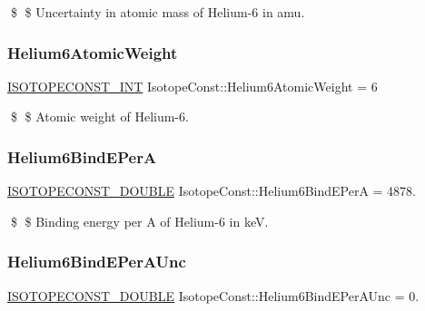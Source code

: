 \$ \$ Uncertainty in atomic mass of Helium-\/6 in amu. \mbox{\label{group___isotope_const-_helium-_he6_ga91ca6cd6a13ee8bc9603870270044db0}} 
\subsubsection{\texorpdfstring{Helium6\+Atomic\+Weight}{Helium6AtomicWeight}}
{\footnotesize\ttfamily \mbox{\hyperlink{group___isotope_const-_macros_ga5f18360b3e99483a35c32d789e62621c}{I\+S\+O\+T\+O\+P\+E\+C\+O\+N\+S\+T\+\_\+\+I\+NT}} Isotope\+Const\+::\+Helium6\+Atomic\+Weight = 6}

\$ \$ Atomic weight of Helium-\/6. \mbox{\label{group___isotope_const-_helium-_he6_gabf28d69da886bab011ba74c62dc3062b}} 
\subsubsection{\texorpdfstring{Helium6\+Bind\+E\+PerA}{Helium6BindEPerA}}
{\footnotesize\ttfamily \mbox{\hyperlink{group___isotope_const-_macros_ga8f45a7272ce02c0b4c65c44636ed719a}{I\+S\+O\+T\+O\+P\+E\+C\+O\+N\+S\+T\+\_\+\+D\+O\+U\+B\+LE}} Isotope\+Const\+::\+Helium6\+Bind\+E\+PerA = 4878.}

\$ \$ Binding energy per A of Helium-\/6 in keV. \mbox{\label{group___isotope_const-_helium-_he6_gabb8237587291c453fefdd155b1206458}} 
\subsubsection{\texorpdfstring{Helium6\+Bind\+E\+Per\+A\+Unc}{Helium6BindEPerAUnc}}
{\footnotesize\ttfamily \mbox{\hyperlink{group___isotope_const-_macros_ga8f45a7272ce02c0b4c65c44636ed719a}{I\+S\+O\+T\+O\+P\+E\+C\+O\+N\+S\+T\+\_\+\+D\+O\+U\+B\+LE}} Isotope\+Const\+::\+Helium6\+Bind\+E\+Per\+A\+Unc = 0.}

